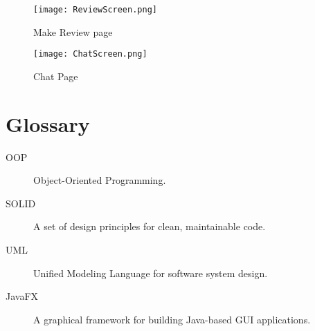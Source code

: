 \documentclass[12pt,a4paper]{report}
\begin{document}
\newpage


\begin{figure}[h!]
\centering
\texttt{[image: ReviewScreen.png]}
\caption{Make Review page}
\end{figure}



\begin{figure}[h!]
\centering
\texttt{[image: ChatScreen.png]}
\caption{Chat Page}
\end{figure}


\newpage


\chapter{Glossary}
\begin{description}
    \item[OOP] Object-Oriented Programming.
    \item[SOLID] A set of design principles for clean, maintainable code.
    \item[UML] Unified Modeling Language for software system design.
    \item[JavaFX] A graphical framework for building Java-based GUI applications.
\end{description}
\end{document}

